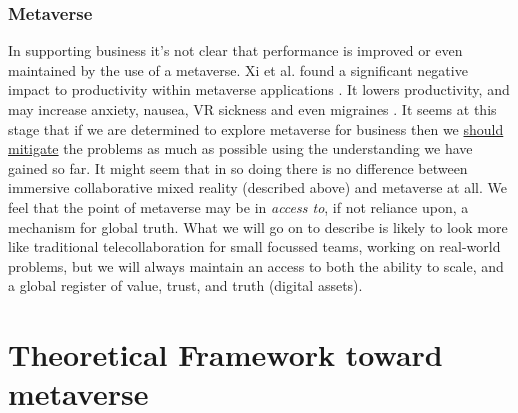 \subsubsection{Metaverse}
In supporting business it's not clear that performance is improved or even maintained by the use of a metaverse. Xi et al. found a significant negative impact to productivity within metaverse applications \cite{xi2022challenges}. It lowers productivity, and may increase anxiety, nausea, VR sickness and even migraines \cite{biener2022quantifying, luong2022demographic}.  It seems at this stage that if we are determined to explore metaverse for business then we \href{http://www.sigtrapgames.com/vrtp/}{should mitigate} the problems as much as possible using the understanding we have gained so far. It might seem that in so doing there is no difference between immersive collaborative mixed reality (described above) and metaverse at all. We feel that the point of metaverse may be in \textit{access to}, if not reliance upon, a mechanism for global truth. What we will go on to describe is likely to look more like traditional telecollaboration for small focussed teams, working on real-world problems, but we will always maintain an access to both the ability to scale, and a global register of value, trust, and truth (digital assets).
\section{Theoretical Framework toward metaverse} 
